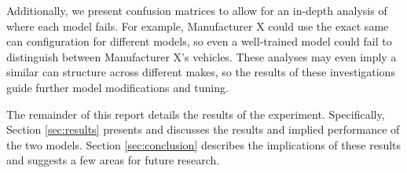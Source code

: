 \documentclass[../main.tex]{subfiles}
\begin{document}

Additionally, we present confusion matrices to allow for an in-depth analysis of where each model fails. For example, Manufacturer X could use the exact same \ac{can} configuration for different models, so even a well-trained model could fail to distinguish between Manufacturer X's vehicles. These analyses may even imply a similar \ac{can} structure across different makes, so the results of these investigations guide further model modifications and tuning.


The remainder of this report details the results of the experiment. Specifically, Section \ref{sec:results} presents and discusses the results and implied performance of the two models. Section \ref{sec:conclusion} describes the implications of these results and suggests a few areas for future research.
\end{document}
